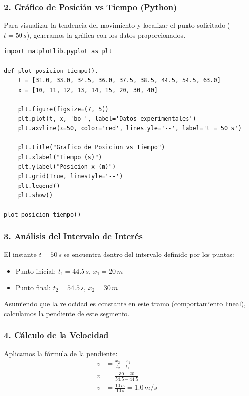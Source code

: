 \documentclass[12pt, a4paper]{article}
\begin{document}
\subsubsection*{2. Gráfico de Posición vs Tiempo (Python)}

Para visualizar la tendencia del movimiento y localizar el punto solicitado ($t = 50 \, \si{s}$), generamos la gráfica con los datos proporcionados.

\begin{lstlisting}
import matplotlib.pyplot as plt

def plot_posicion_tiempo():
    t = [31.0, 33.0, 34.5, 36.0, 37.5, 38.5, 44.5, 54.5, 63.0]
    x = [10, 11, 12, 13, 14, 15, 20, 30, 40]
    
    plt.figure(figsize=(7, 5))
    plt.plot(t, x, 'bo-', label='Datos experimentales')
    plt.axvline(x=50, color='red', linestyle='--', label='t = 50 s')
    
    plt.title("Grafico de Posicion vs Tiempo")
    plt.xlabel("Tiempo (s)")
    plt.ylabel("Posicion x (m)")
    plt.grid(True, linestyle='--')
    plt.legend()
    plt.show()

plot_posicion_tiempo()
\end{lstlisting}

\subsubsection*{3. Análisis del Intervalo de Interés}

El instante $t = 50 \, \si{s}$ se encuentra dentro del intervalo definido por los puntos:
\begin{itemize}
    \item Punto inicial: $t_1 = 44.5 \, \si{s}, \, x_1 = 20 \, \si{m}$
    \item Punto final: $t_2 = 54.5 \, \si{s}, \, x_2 = 30 \, \si{m}$
\end{itemize}

Asumiendo que la velocidad es constante en este tramo (comportamiento lineal), calculamos la pendiente de este segmento.

\subsubsection*{4. Cálculo de la Velocidad}

Aplicamos la fórmula de la pendiente:
\begin{align*}
    v &= \frac{x_2 - x_1}{t_2 - t_1} \\
    v &= \frac{30 - 20}{54.5 - 44.5} \\
    v &= \frac{10 \, \si{m}}{10 \, \si{s}} = 1.0 \, \si{m/s}
\end{align*}
\end{document}

